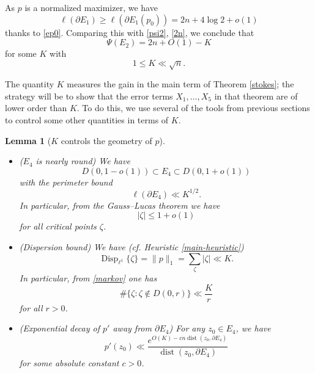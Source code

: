 \documentclass[12pt]{amsart}
\newtheorem{lemma}{Lemma}[section]
\newcommand{\dist}{\operatorname{dist}}
\newcommand{\Disp}{\operatorname{Disp}_{\ell^1}}
\begin{document}
As $p$ is a normalized maximizer, we have
\begin{equation}\label{lupin}
 \ell(\partial E_1) \geq \ell(\partial E_1(p_0)) = 2n + 4 \log 2 + o(1)
\end{equation}
thanks to \eqref{ep0}.  Comparing this with \eqref{psi2}, \eqref{2n}, we conclude that
\begin{equation}\label{e2}
 \Psi(E_2) = 2n + O(1) - K
\end{equation}
for some $K$ with
\begin{equation}\label{ksqr}
1 \leq K \ll \sqrt{n}.
\end{equation}

The quantity $K$ measures the gain in the main term of Theorem \ref{stokes}; the strategy will be to show that the error terms $X_1,\dots,X_5$ in that theorem are of lower order than $K$.  To do this, we use several of the tools from previous sections to control some other quantities in terms of $K$.

\begin{lemma}[$K$ controls the geometry of $p$]\label{geomcontrol}\
    \begin{itemize}
        \item[(i)]  ($E_4$ is nearly round) We have
\begin{equation}\label{incl}
 D(0, 1-o(1)) \subset E_4 \subset D(0,1+o(1))
\end{equation}
with the perimeter bound
\begin{equation}\label{perimeter}
    \ell(\partial E_4) \ll K^{1/2}.
\end{equation}
In particular, from the Gauss--Lucas theorem we have
\begin{equation}\label{crit-bound}
    |\zeta| \leq 1 + o(1)
\end{equation}
for all critical points $\zeta$.
\item[(ii)]  (Dispersion bound)  We have (cf. Heuristic \ref{main-heuristic})
\begin{equation}\label{first}
\Disp \{\zeta\} = \|p\|_1 = \sum_\zeta |\zeta| \ll K.
\end{equation}
In particular, from \eqref{markov} one has
\begin{equation}\label{first-markov}
    \# \{ \zeta: \zeta \notin D(0,r) \} \ll \frac{K}{r}
\end{equation}
for all $r>0$.
\item[(iii)] (Exponential decay of $p'$ away from $\partial E_4$)  For any $z_0 \in E_4$, we have
\begin{equation}\label{exp-decay}
    p'(z_0) \ll \frac{e^{O(K)-c n \dist(z_0, \partial E_4)}}{\dist(z_0, \partial E_4)}
\end{equation}
for some absolute constant $c>0$.
\end{itemize}
\end{lemma}
\end{document}
